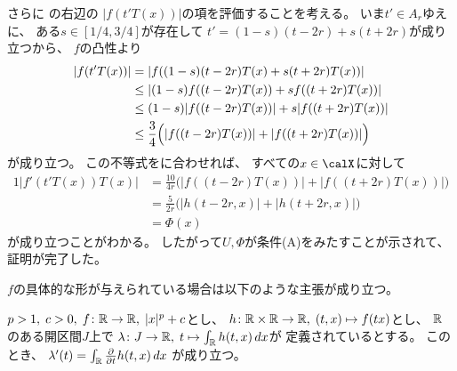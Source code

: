 \documentclass[report]{jlreq}
\begin{document}
\begin{answer}
    さらに
    の右辺の
    $|f(t'T(x))|$の項を評価することを考える。
    いま$t' \in A_r$ゆえに、
    ある$s \in [1/4, 3/4]$が存在して
    $t' = (1 - s)(t - 2r) + s(t + 2r)$が成り立つから、
    $f$の凸性より
    \begin{alignat}{1}
        |f(t'T(x))|
            &=
                \left|{
                    f((1 - s)(t - 2r)T(x) + s(t + 2r)T(x))
                }\right|
                \\
            &\le
                \left|{
                    (1 - s)f((t - 2r)T(x)) + sf((t + 2r)T(x))
                }\right|
                \\
            &\le
                (1 - s) |f((t - 2r)T(x))| + s |f((t + 2r)T(x))|
                \\
            &\le
                \frac{3}{4}
                \Big(
                    |f((t - 2r)T(x))| + |f((t + 2r)T(x))|
                \Big)
    \end{alignat}
    が成り立つ。
    この不等式をに合わせれば、
    すべての$x \in \calX$に対して
    \begin{alignat}{1}
        |f'(t'T(x)) T(x)|
            &=
                \frac{10}{4r}
                \Big(
                    |f((t - 2r)T(x))|
                    +
                    |f((t + 2r)T(x))|
                \Big)
                \\
            &=
                \frac{5}{2r}
                \Big(
                    |h(t - 2r, x)|
                    +
                    |h(t + 2r, x)|
                \Big)
                \\
            &=
                \Phi(x)
    \end{alignat}
    が成り立つことがわかる。
    したがって$U, \Phi$が条件(A)をみたすことが示されて、
    証明が完了した。
\end{answer}

\newpage
$f$の具体的な形が与えられている場合は以下のような主張が成り立つ。

\begin{proposition}
    $p > 1, \; c > 0, \;
        f \colon \mathbb{R} \to \mathbb{R}, \; |x|^p + c$とし、
    $h \colon \mathbb{R} \times \mathbb{R} \to \mathbb{R}, \; (t, x) \mapsto f(tx)$とし、
    $\mathbb{R}$のある開区間$J$上で
    $\lambda \colon J \to \mathbb{R}, \; t \mapsto \int_{\mathbb{R}} h(t, x) \, dx$が
    定義されているとする。
    このとき、
    $\lambda'(t) = \int_\R \deldel{t} h(t, x) \, dx$
    が成り立つ。
\end{proposition}
\end{document}
